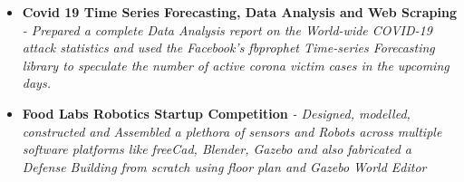 \documentclass{article}
\begin{document}
\begin{itemize}
    \item{\textbf{\large{Covid 19 Time Series Forecasting, Data Analysis and Web Scraping}}}
          \newline
          \textit{- Prepared a complete Data Analysis report on the World-wide COVID-19 attack statistics and used the Facebook's fbprophet Time-series Forecasting library to speculate the number of active corona victim cases in the upcoming days.}





    \item{\textbf{\large{Food Labs Robotics Startup Competition}}}
          \newline
          \textit{- Designed, modelled, constructed and
              Assembled a plethora of sensors and Robots across multiple software platforms like
              freeCad, Blender, Gazebo and also fabricated a Defense Building from scratch using floor plan and Gazebo World Editor}


\end{itemize}
\end{document}
